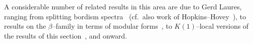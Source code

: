 \begin{remark}
A considerable number of related results in this area are due to Gerd Laures, ranging from splitting bordism spectra~\cite{LauresSplitting} (cf.\ also work of Hopkins--Hovey~\cite{HopkinsHovey}), to results on the $\beta$--family in terms of modular forms~\cite{BehrensLaures}, to $K(1)$--local versions of the results of this section~\cite{KitchlooLaures}, and onward.
\end{remark}









